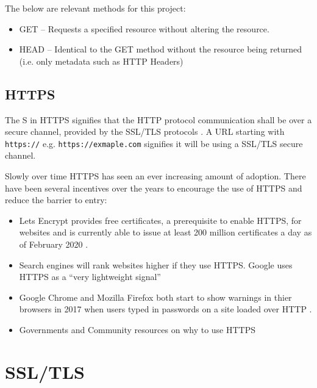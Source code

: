 \documentclass{mscreport}
\begin{document}
\vspace{0.3cm} \noindent
The below are relevant methods for this project:
\begin{itemize}
	\setlength\itemsep{0.1em}
	\item GET – Requests a specified resource without altering the resource.
	\item HEAD – Identical to the GET method without the resource being returned (i.e. only metadata such as HTTP Headers)
\end{itemize}

\subsection{HTTPS}

\noindent The S in HTTPS signifies that the HTTP protocol communication shall be over a secure channel, provided by the SSL/TLS protocols \cite{Rescorla2000-fs}. A URL starting with \texttt{https://} e.g. \texttt{https://exmaple.com} signifies it will be using a SSL/TLS secure channel.

\vspace{0.3cm}
\noindent Slowly over time HTTPS has seen an ever increasing amount of adoption. There have been several incentives over the years to encourage the use of HTTPS and reduce the barrier to entry:

\begin{itemize}
	\setlength\itemsep{0.1em}
	\item Lets Encrypt provides free certificates, a prerequisite to enable HTTPS, for websites and is currently able to issue at least 200 million certificates a day as of February 2020 \cite{noauthor_undated-bi}.
	\item Search engines will rank websites higher if they use HTTPS. Google uses HTTPS as a ``very lightweight signal'' \cite{noauthor_undated-im}
	\item Google Chrome and Mozilla Firefox both start to show warnings in thier browsers in 2017 when users typed in passwords on a site loaded over HTTP \cite{Vyas2017-ds,Google_undated-ws}.
	\item Governments and Community resources on why to use HTTPS \cite{noauthor_undated-oz,noauthor_undated-xk}
\end{itemize}

\newpage

\section{SSL/TLS}
\label{section:ssl_tls}
\end{document}
